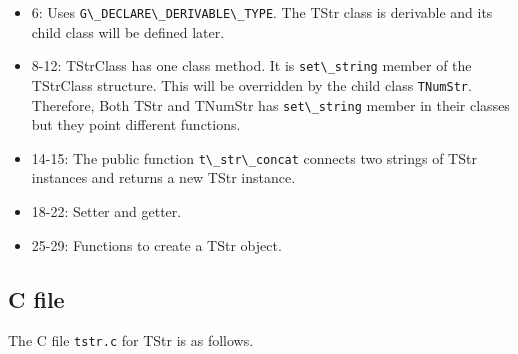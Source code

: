 \begin{itemize}
\tightlist
\item
  6: Uses \passthrough{\lstinline!G\_DECLARE\_DERIVABLE\_TYPE!}. The
  TStr class is derivable and its child class will be defined later.
\item
  8-12: TStrClass has one class method. It is
  \passthrough{\lstinline!set\_string!} member of the TStrClass
  structure. This will be overridden by the child class
  \passthrough{\lstinline!TNumStr!}. Therefore, Both TStr and TNumStr
  has \passthrough{\lstinline!set\_string!} member in their classes but
  they point different functions.
\item
  14-15: The public function \passthrough{\lstinline!t\_str\_concat!}
  connects two strings of TStr instances and returns a new TStr
  instance.
\item
  18-22: Setter and getter.
\item
  25-29: Functions to create a TStr object.
\end{itemize}

\subsection{C file}\label{c-file}

The C file \passthrough{\lstinline!tstr.c!} for TStr is as follows.


